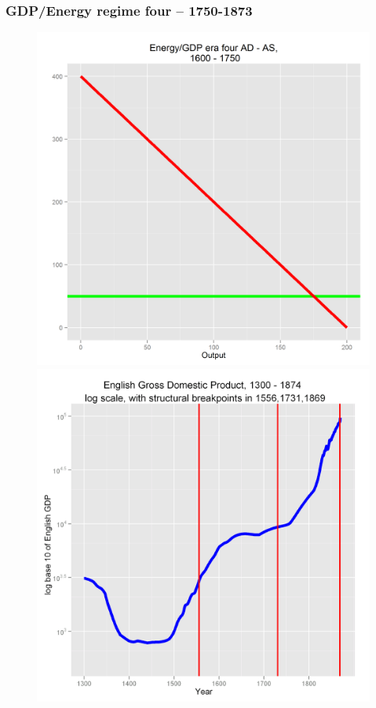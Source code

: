 \documentclass[final]{beamer}
\begin{document}
\begin{frame}
\frametitle{GDP/Energy regime four -- 1750-1873}
		\begin{figure}[p!]
		\label{fig:asad}		
		\centerline{
		\mbox{\includegraphics[height=0.5\textheight]{era4}}
		\mbox{\includegraphics[height=0.5\textheight]{gbpgdplog}}
}
\end{figure}
\end{frame}
\end{document}
